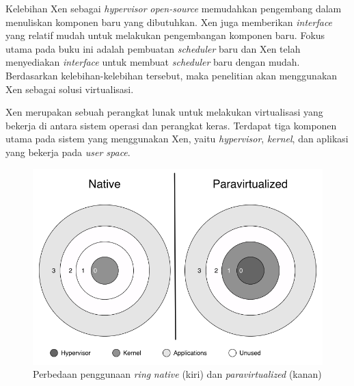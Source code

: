 Kelebihan Xen sebagai \textit{hypervisor} \textit{open-source} memudahkan pengembang dalam
menuliskan komponen baru yang dibutuhkan. Xen juga memberikan \textit{interface} yang
relatif mudah untuk melakukan pengembangan komponen baru. Fokus utama pada buku ini adalah
pembuatan \textit{scheduler} baru dan Xen telah menyediakan \textit{interface} untuk membuat
\textit{scheduler} baru dengan mudah.  Berdasarkan kelebihan-kelebihan tersebut, maka penelitian
akan menggunakan Xen sebagai solusi virtualisasi.

Xen merupakan sebuah perangkat lunak untuk melakukan virtualisasi yang bekerja di antara sistem
operasi dan perangkat keras. Terdapat tiga komponen utama pada sistem yang menggunakan Xen,
yaitu \textit{hypervisor}, \textit{kernel}, dan aplikasi yang bekerja pada \textit{user space}.

\begin{figure}[!ht]
    \includegraphics[scale=0.5]{./resources/xen-ring.png}
    \caption[Perbedaan penggunaan \textit{ring} \textit{native} dan
    \textit{paravirtualized}]{Perbedaan penggunaan \textit{ring} \textit{native} (kiri) dan
    \textit{paravirtualized} (kanan) \citep{Chisnall2014}}
    \label{figure:xen_ring}
\end{figure}

